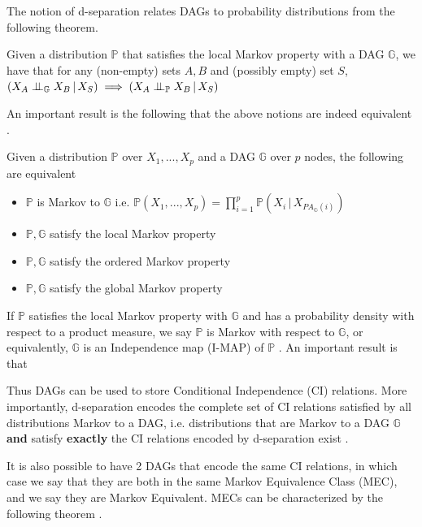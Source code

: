 \documentclass{tufte-book}
\begin{document}
The notion of d-separation relates DAGs to probability distributions from the following theorem.
\begin{theorem}\label{thm:dagci}

Given a distribution $\mathbb{P}$ that satisfies the local Markov property with a DAG $\mathbb{G}$, we have that for any (non-empty) sets $A,B$ and (possibly empty) set $S$, $(X_A \perp \!\!\! \perp_{\mathbb{G}} X_B \,|\,X_S) \implies (X_A \perp \!\!\! \perp_{\mathbb{P}} X_B \,|\, X_S)$


\end{theorem}

An important result is the following that the above notions are indeed equivalent \cite{duarte-2020-algeb}.

\begin{theorem}
Given a distribution $\mathbb{P}$ over $X_1,...,X_p$ and a DAG $\mathbb{G}$ over $p$ nodes, the following are equivalent

\begin{itemize}
\item $\mathbb{P}$ is Markov to $\mathbb{G}$ i.e. $\mathbb{P}(X_1,...,X_p) = \prod_{i=1}^p \mathbb{P}(X_i \, |\, X_{PA_{\mathbb{G}}(i)})$
\item $\mathbb{P}, \mathbb{G}$ satisfy the local Markov property
\item $\mathbb{P}, \mathbb{G}$ satisfy the ordered Markov property
\item $\mathbb{P}, \mathbb{G}$ satisfy the global Markov property
\end{itemize}

\end{theorem}


If \(\mathbb{P}\) satisfies the local Markov property with \(\mathbb{G}\) and has a probability density with respect to a product measure, we say \(\mathbb{P}\) is Markov with respect to \(\mathbb{G}\), or equivalently, \(\mathbb{G}\) is an Independence map (I-MAP) of \(\mathbb{P}\) \cite{lauritzen-1996-graph}. An important result is that 


Thus DAGs can be used to store Conditional Independence (CI) relations. More importantly, d-separation encodes the complete set of CI relations satisfied by all distributions Markov to a DAG, i.e. distributions that are Markov to a DAG \(\mathbb{G}\) \textbf{and} satisfy \textbf{exactly} the CI relations encoded by d-separation exist \cite{meek-2013-stron-compl,geiger1990identifying}.

It is also possible to have 2 DAGs that encode the same CI relations, in which case we say that they are both in the same Markov Equivalence Class (MEC), and we say they are Markov Equivalent. MECs can be characterized by the following theorem \cite{verma-2013-equiv-causal-model}.
\end{document}
